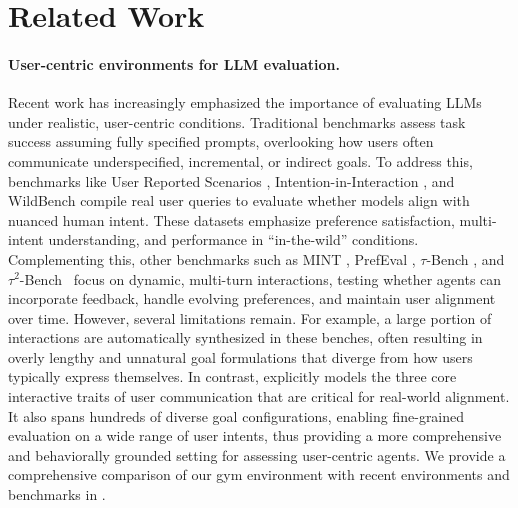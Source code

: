 \section{Related Work}

\paragraph{User-centric environments for LLM evaluation.}  
Recent work has increasingly emphasized the importance of evaluating LLMs under realistic, user-centric conditions. Traditional benchmarks assess task success assuming fully specified prompts, overlooking how users often communicate underspecified, incremental, or indirect goals. To address this, benchmarks like User Reported Scenarios \citep{wang2024user}, Intention-in-Interaction \citep{qian2024tell}, and WildBench \citep{lin2024wildbench} compile real user queries to evaluate whether models align with nuanced human intent. These datasets emphasize preference satisfaction, multi-intent understanding, and performance in ``in-the-wild'' conditions. Complementing this, other benchmarks such as MINT \citep{wang2024mint}, PrefEval \citep{zhao2025prefeval}, $\tau$-Bench \citep{yao2024tau}, and $\tau^{2}$-Bench~\citep{barres2025tau} focus on dynamic, multi-turn interactions, testing whether agents can incorporate feedback, handle evolving preferences, and maintain user alignment over time. However, several limitations remain. For example, a large portion of interactions are automatically synthesized in these benches, often resulting in overly lengthy and unnatural goal formulations that diverge from how users typically express themselves. In contrast, {\gymname} explicitly models the three core interactive traits of user communication that are critical for real-world alignment. It also spans hundreds of diverse goal configurations, enabling fine-grained evaluation on a wide range of user intents, thus providing a more comprehensive and behaviorally grounded setting for assessing user-centric agents. We provide a comprehensive comparison of our gym environment with recent environments and benchmarks in .



